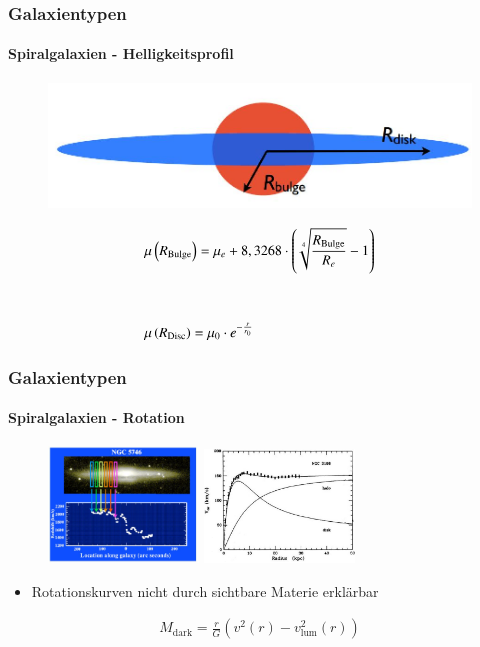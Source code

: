 \begin{frame}
\frametitle{Galaxientypen}
\framesubtitle{Spiralgalaxien - Helligkeitsprofil}

\begin{figure}
\includegraphics[scale=0.25]{Spiralgalaxie_Schema.jpg}
\end{figure}

\begin{align*}
&\mu \left( R_{\text{Bulge}} \right) = \mu_e + 8,3268 \cdot \left( \sqrt[4]{\frac{R_{\text{Bulge}}}{R_e}} - 1 \right) \\
\hfill \\
\hfill \\
&\mu \left( R_{\text{Disc}} \right) = \mu_0 \cdot e^{-\frac{r}{r_0}}
\end{align*}

\end{frame}

\begin{frame}
\frametitle{Galaxientypen}
\framesubtitle{Spiralgalaxien - Rotation}


\begin{figure}
\begin{minipage}[hbt]{4cm}
	\includegraphics[width=4cm]{Spiralgalaxie_Rotation1.jpg}
\end{minipage}
\begin{minipage}[hbt]{4cm}
	\includegraphics[width=4cm]{Spiralgalaxie_Rotation2.jpg}
\end{minipage}
\end{figure}

\begin{itemize}
\item Rotationskurven nicht durch sichtbare Materie erklärbar
\end{itemize}


\begin{align*}
M_{\text{dark}} = \frac{r}{G} \left( v^2(r) - v_{\text{lum}}^2(r) \right)
\end{align*}

\end{frame}


